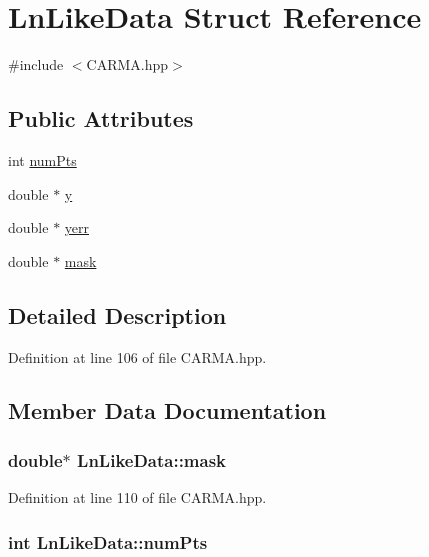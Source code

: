 \hypertarget{struct_ln_like_data}{\section{Ln\-Like\-Data Struct Reference}
\label{struct_ln_like_data}
}


{\ttfamily \#include $<$C\-A\-R\-M\-A.\-hpp$>$}

\subsection*{Public Attributes}
\begin{DoxyCompactItemize}
\item 
int \hyperlink{struct_ln_like_data_a06edae26098d8ccd31a18fa0995fed86}{num\-Pts}
\item 
double $\ast$ \hyperlink{struct_ln_like_data_ac75cc1e68fffac23d841e09f927a0a53}{y}
\item 
double $\ast$ \hyperlink{struct_ln_like_data_a54330ef049f623a902d04f58e5aee208}{yerr}
\item 
double $\ast$ \hyperlink{struct_ln_like_data_a51c6e3bd71666d529910318735f0df21}{mask}
\end{DoxyCompactItemize}


\subsection{Detailed Description}


Definition at line 106 of file C\-A\-R\-M\-A.\-hpp.



\subsection{Member Data Documentation}
\hypertarget{struct_ln_like_data_a51c6e3bd71666d529910318735f0df21}{
\subsubsection[{mask}]{\setlength{\rightskip}{0pt plus 5cm}double$\ast$ Ln\-Like\-Data\-::mask}}\label{struct_ln_like_data_a51c6e3bd71666d529910318735f0df21}


Definition at line 110 of file C\-A\-R\-M\-A.\-hpp.

\hypertarget{struct_ln_like_data_a06edae26098d8ccd31a18fa0995fed86}{
\subsubsection[{num\-Pts}]{\setlength{\rightskip}{0pt plus 5cm}int Ln\-Like\-Data\-::num\-Pts}}\label{struct_ln_like_data_a06edae26098d8ccd31a18fa0995fed86}


